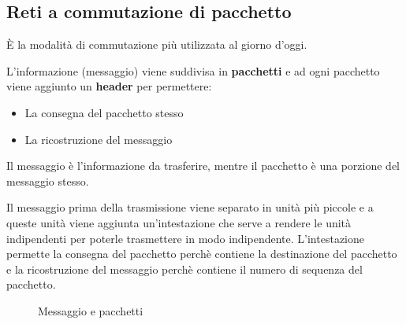 \documentclass[a4paper]{article}
\begin{document}
\subsection{Reti a commutazione di pacchetto}
È la modalità di commutazione più utilizzata al giorno d'oggi.

\noindent
L'informazione (messaggio) viene suddivisa in \textbf{pacchetti} e ad ogni
pacchetto viene aggiunto un \textbf{header} per permettere:
\begin{itemize}
  \item La consegna del pacchetto stesso
  \item La ricostruzione del messaggio
\end{itemize}

Il messaggio è l'informazione da trasferire, mentre il pacchetto è una porzione
del messaggio stesso.

\noindent
Il messaggio prima della trasmissione viene separato in unità più piccole e a
queste unità viene aggiunta un'intestazione che serve a rendere le unità indipendenti
per poterle trasmettere in modo indipendente. L'intestazione permette la consegna del
pacchetto perchè contiene la destinazione del pacchetto e la ricostruzione del messaggio
perchè contiene il numero di sequenza del pacchetto.
\begin{figure}[H]
  \centering
  \caption{Messaggio e pacchetti}
\end{figure}
\end{document}
